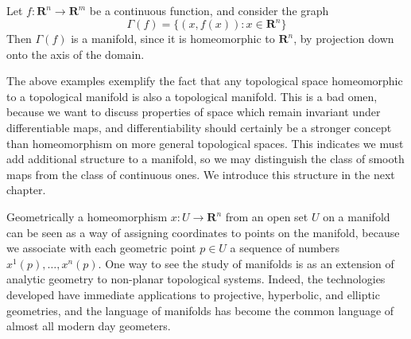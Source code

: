 \begin{example}
    Let $f: \mathbf{R}^n \to \mathbf{R}^m$ be a continuous function, and consider the graph
    \[ \Gamma(f) = \{ (x, f(x)) : x \in \mathbf{R}^n \} \]
    Then $\Gamma(f)$ is a manifold, since it is homeomorphic to $\mathbf{R}^n$, by projection down onto the axis of the domain.
\end{example}




The above examples exemplify the fact that any topological space homeomorphic to a topological manifold is also a topological manifold. This is a bad omen, because we want to discuss properties of space which remain invariant under differentiable maps, and differentiability should certainly be a stronger concept than homeomorphism on more general topological spaces. This indicates we must add additional structure to a manifold, so we may distinguish the class of smooth maps from the class of continuous ones. We introduce this structure in the next chapter.

Geometrically a homeomorphism $x: U \to \mathbf{R}^n$ from an open set $U$ on a manifold can be seen as a way of assigning coordinates to points on the manifold, because we associate with each geometric point $p \in U$ a sequence of numbers $x^1(p), \dots, x^n(p)$. One way to see the study of manifolds is as an extension of analytic geometry to non-planar topological systems. Indeed, the technologies developed have immediate applications to projective, hyperbolic, and elliptic geometries, and the language of manifolds has become the common language of almost all modern day geometers.

